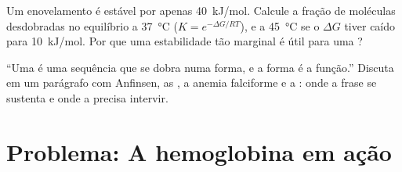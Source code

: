 \begin{exercise}[$\star\star\star$]\label{exo:b1:proteins:11}
Um enovelamento é estável por apenas \qty{40}{kJ/mol}. Calcule a fração
de moléculas desdobradas no equilíbrio a \qty{37}{\celsius}
($K = e^{-\Delta G/RT}$), e a \qty{45}{\celsius} se o $\Delta G$ tiver
caído para \qty{10}{kJ/mol}. Por que uma estabilidade tão marginal é
útil para uma ?
\end{exercise}

\begin{exercise}[$\star\star\star$]\label{exo:b1:proteins:12}
``Uma  é uma sequência que se dobra numa forma, e a forma é a
função.'' Discuta em um parágrafo com Anfinsen, as , a anemia
falciforme e a : onde a frase se sustenta e onde a 
precisa intervir.
\end{exercise}

\section{Problema: A hemoglobina em ação}

